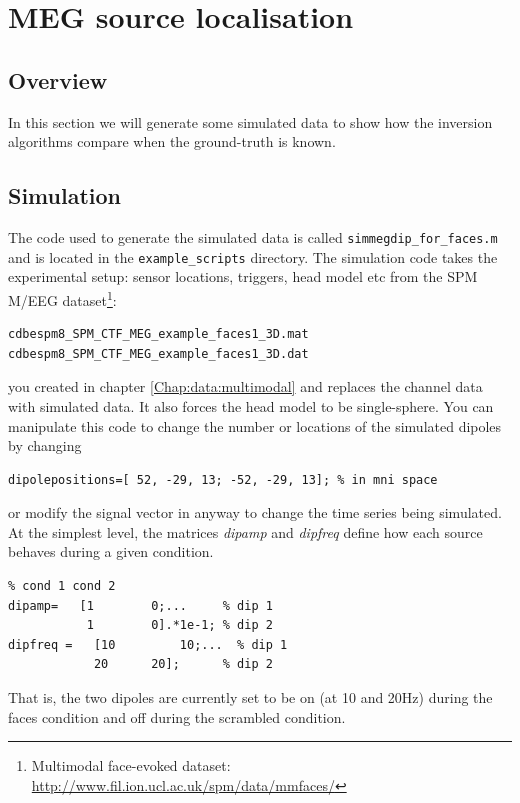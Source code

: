 \chapter{MEG source localisation\label{Chap:data:sloc}}

\section{Overview}
In this section we will generate some simulated data to show how the inversion algorithms compare when the ground-truth is known. 

\section{Simulation}
The code used to generate the simulated data is called \texttt{simmegdip\_for\_faces.m} and is located in the \texttt{example\_scripts} directory. The simulation code takes the experimental setup: sensor locations, triggers, head model etc from the SPM M/EEG dataset\footnote{Multimodal face-evoked dataset: \url{http://www.fil.ion.ucl.ac.uk/spm/data/mmfaces/}}:

\begin{verbatim}
cdbespm8_SPM_CTF_MEG_example_faces1_3D.mat
cdbespm8_SPM_CTF_MEG_example_faces1_3D.dat
\end{verbatim}

you created in chapter \ref{Chap:data:multimodal} and replaces the channel data with simulated data. It also forces the head model to be single-sphere.
You can manipulate this code to change the number or locations of the simulated dipoles by changing

\begin{verbatim}
dipolepositions=[ 52, -29, 13; -52, -29, 13]; % in mni space
\end{verbatim}
or modify the signal vector in anyway to change the time series being simulated. At the simplest level, the matrices \textit{dipamp} and \textit{dipfreq} define how each source behaves during a given condition. 

\begin{verbatim}
% cond 1 cond 2
dipamp=	  [1 		0;...     % dip 1
           1 		0].*1e-1; % dip 2 
dipfreq =	[10 		10;... 	% dip 1
         	20 		20];      % dip 2
\end{verbatim}

That is, the two dipoles are currently set to be on (at 10 and 20Hz) during the faces condition and off during the scrambled condition.

